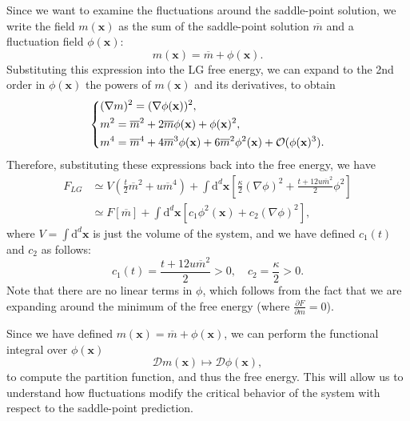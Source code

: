 Since we want to examine the fluctuations around the saddle-point solution, we write the field \( m(\mathbf{x}) \) as the sum of the saddle-point solution \( \overline{m} \) and a fluctuation field \( \phi(\mathbf{x}) \):
\[
    m(\mathbf{x}) = \overline{m} + \phi(\mathbf{x}).
\]
Substituting this expression into the LG free energy, we can expand to the 2nd order in \( \phi(\mathbf{x}) \) the powers of \(m(\mathbf{x})\) and its derivatives, to obtain
\[
    \begin{dcases}
        (\nabla m)^2 = (\nabla\phi(\mathbf{x}))^2,                                          \\
        m^2          = \overline{m}^2 + 2\overline{m}\phi(\mathbf{x}) + \phi(\mathbf{x})^2, \\
        m^4          = \overline{m}^4 + 4\overline{m}^3\phi(\mathbf{x}) + 6\overline{m}^2\phi^2(\mathbf{x}) + \mathcal{O}(\phi(\mathbf{x})^3).
    \end{dcases}
\]
Therefore, substituting these expressions back into the free energy, we have
\[
    \begin{aligned}
        F_{LG} & \simeq V \left( \frac{t}{2}\overline{m}^2 + u\overline{m}^4 \right) + \int \mathrm{d}^d \mathbf{x} \left[ \frac{\kappa}{2}(\nabla\phi)^2 + \frac{t + 12u\overline{m}^2}{2}\phi^2 \right] \\
               & \simeq F[\overline{m}] + \int \mathrm{d}^d \mathbf{x} \left[ c_1 \phi^2(\mathbf{x}) + c_2(\nabla\phi)^2 \right],
    \end{aligned}
\]
where \(V = \int \mathrm{d}^d \mathbf{x} \) is just the volume of the system, and we have defined \(c_1(t)\) and \(c_2\) as follows:
\[
    c_1(t) = \frac{t + 12u\overline{m}^2}{2} > 0, \quad c_2 = \frac{\kappa}{2} > 0.
\]
Note that there are no linear terms in \( \phi \), which follows from the fact that we are expanding around the minimum of the free energy (where \( \tfrac{\partial F}{\partial m} = 0 \)).

Since we have defined \(m(\mathbf{x}) = \overline{m} + \phi(\mathbf{x})\), we can perform the functional integral over \( \phi(\mathbf{x}) \)
\[
    \mathcal{D} m(\mathbf{x}) \mapsto \mathcal{D}\phi(\mathbf{x}),
\]
to compute the partition function, and thus the free energy. This will allow us to understand how fluctuations modify the critical behavior of the system with respect to the saddle-point prediction.

